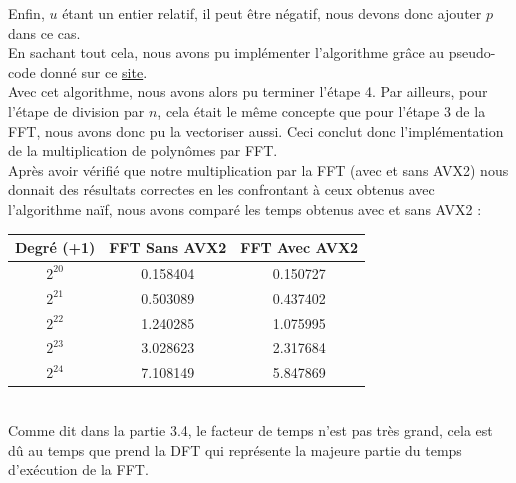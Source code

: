 \documentclass[12pt, a4paper]{article}
\begin{document}
Enfin, $u$ étant un entier relatif, il peut être négatif, nous devons donc ajouter $p$ dans ce cas. \\
\indent En sachant tout cela, nous avons pu implémenter l'algorithme grâce au pseudo-code donné sur ce \href{https://www.dcode.fr/identite-bezout}{\underline{\color{blue}site}}. \\
\indent Avec cet algorithme, nous avons alors pu terminer l'étape 4. Par ailleurs, pour l'étape de division par $n$, cela était le même concepte que pour l'étape 3 de la FFT, nous avons donc pu la vectoriser aussi. Ceci conclut donc l'implémentation de la multiplication de polynômes par FFT. \\
\indent Après avoir vérifié que notre multiplication par la FFT (avec et sans AVX2) nous donnait des résultats correctes en les confrontant à ceux obtenus avec l'algorithme naïf, nous avons comparé les temps obtenus avec et sans AVX2 :

\begin{center}
\begin{tabular}{||c c c||}
\hline
Degré (+1) & FFT Sans AVX2 & FFT Avec AVX2 \\
\hline\hline
$2^{20}$ & 0.158404 & 0.150727 \\
\hline
$2^{21}$ & 0.503089 & 0.437402 \\
\hline
$2^{22}$ & 1.240285 & 1.075995 \\
\hline
$2^{23}$ & 3.028623 & 2.317684 \\
\hline
$2^{24}$ & 7.108149 & 5.847869 \\
\hline
\end{tabular}
\end{center}
{}
\ \\
\indent Comme dit dans la partie 3.4, le facteur de temps n'est pas très grand, cela est dû au temps que prend la DFT qui représente la majeure partie du temps d'exécution de la FFT.
\end{document}
